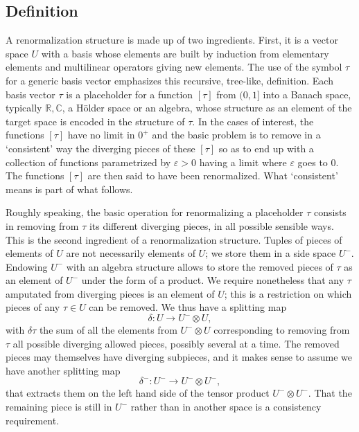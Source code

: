 \documentclass[10pt, reqno]{amsart}
\numberwithin{subsection}{section}
\numberwithin{subsubsection}{subsection}
\numberwithin{equation}{section} %
\theoremstyle{mystyle}
\theoremstyle{mystyle2}
\theoremstyle{mystyle3}
\newcommand{\ssk}{\smallskip}
\renewcommand{\epsilon}{\varepsilon}
\newcommand\bbC{\mathbb{C}}
\newcommand\bbR{\mathbb{R}}
\begin{document}
\bigskip



\subsection{Definition}
\label{SectionConcreteRenorS}

A renormalization structure is made up of two ingredients. First, it is a vector space $U$ with a basis whose elements are built by induction from elementary elements and multilinear operators giving new elements. The use of the symbol $\tau$ for a generic basis vector emphasizes this recursive, tree-like, definition. Each basis vector $\tau$ is a placeholder for a function $[\tau]$ from $(0,1]$ into a Banach space, typically $\bbR,\bbC$, a H\"older space or an algebra, whose structure as an element of the target space is encoded in the structure of $\tau$. In the cases of interest, the functions $[\tau]$ have no limit in $0^+$ and the basic problem is to remove in a `consistent' way the diverging pieces of these $[\tau]$ so as to end up with a collection of functions parametrized by $\epsilon>0$ having a limit where $\varepsilon$ goes to $0$. The functions $[\tau]$ are then said to have been renormalized. What `consistent' means is part of what follows.

\ssk

Roughly speaking, the basic operation for renormalizing a placeholder $\tau$ consists in removing from $\tau$ its different diverging pieces, in all possible sensible ways. This is the second ingredient of a renormalization structure. Tuples of pieces of elements of $U$ are not necessarily elements of $U$; we store them in a side space $U^-$. Endowing $U^-$ with an algebra structure allows to store the removed pieces of $\tau$ as an element of $U^-$ under the form of a product. We require nonetheless that any $\tau$ amputated from diverging pieces is an element of $U$; this is a restriction on which pieces of any $\tau\in U$ can be removed. We thus have a splitting map 
$$
\delta: U\rightarrow U^-\otimes U,
$$
with $\delta\tau$ the sum of all the elements from $U^-\otimes U$ corresponding to removing from $\tau$ all possible diverging allowed pieces, possibly several at a time. The removed pieces may themselves have diverging 
subpieces, and it makes sense to assume we have another splitting map 
$$
\delta^-: U^-\rightarrow U^-\otimes U^-,
$$
that extracts them on the left hand side of the tensor product $U^-\otimes U^-$. That the remaining piece is still in $U^-$ rather than in another 
space is a consistency requirement. 
\end{document}
